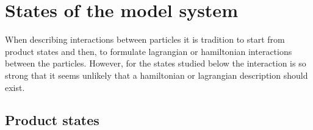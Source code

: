 \documentclass[12pt,a4paper]{article}
\begin{document}
\section{States of the model system}

When describing interactions between particles it is
tradition to start from product states and then, to formulate
lagrangian or hamiltonian interactions between the particles.
However, for the states studied below the interaction is
so strong that it seems unlikely that a hamiltonian or
lagrangian description should exist.

\subsection{Product states}
\end{document}
